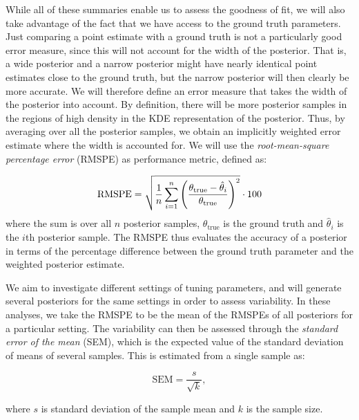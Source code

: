 While all of these summaries enable us to assess the goodness of fit, we will also take advantage of the fact that we have access to the ground truth parameters. Just comparing a point estimate with a ground truth is not a particularly good error measure, since this will not account for the width of the posterior. That is, a wide posterior and a narrow posterior might have nearly identical point estimates close to the ground truth, but the narrow posterior will then clearly be more accurate. We will therefore define an error measure that takes the width of the posterior into account. By definition, there will be more posterior samples in the regions of high density in the KDE representation of the posterior. Thus, by averaging over all the posterior samples, we obtain an implicitly weighted error estimate where the width is accounted for. We will use the \textit{root-mean-square percentage error} (RMSPE) as performance metric, defined as:

\begin{equation}\label{eq:rmspe}
    \mathrm{RMSPE} = \sqrt{\frac{1}{n} \sum_{i=1}^n \qty(\frac{\theta_\mathrm{true}-\hat{\theta}_i}{\theta_\mathrm{true}} )^2} \cdot 100
\end{equation}
where the sum is over all $n$ posterior samples, $\theta_\mathrm{true}$ is the ground truth and $\hat{\theta}_i$ is the $i$th posterior sample. The RMSPE thus evaluates the accuracy of a posterior in terms of the percentage difference between the ground truth parameter and the weighted posterior estimate. 

We aim to investigate different settings of tuning parameters, and will generate several posteriors for the same settings in order to assess variability. In these analyses, we take the RMSPE to be the mean of the RMSPEs of all posteriors for a particular setting. The variability can then be assessed through the \textit{standard error of the mean} (SEM), which is the expected value of the standard deviation of means of several samples. This is estimated from a single sample as:

\begin{equation}\label{eq:sem}
    \mathrm{SEM} = \frac{s}{\sqrt{k}},
\end{equation}

where $s$ is standard deviation of the sample mean and $k$ is the sample size.







